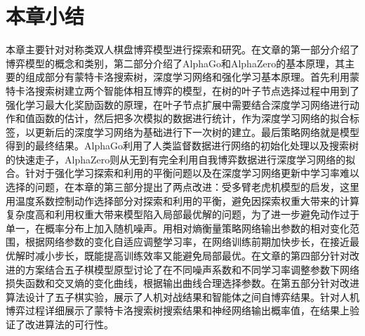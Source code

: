 \section{本章小结}

本章主要针对对称类双人棋盘博弈模型进行探索和研究。在文章的第一部分介绍了博弈模型的概念和类别，第二部分介绍了AlphaGo和AlphaZero的基本原理，其主要的组成部分有蒙特卡洛搜索树，深度学习网络和强化学习基本原理。首先利用蒙特卡洛搜索树建立两个智能体相互博弈的模型，在树的叶子节点选择过程中用到了强化学习最大化奖励函数的原理，在叶子节点扩展中需要结合深度学习网络进行动作和值函数的估计，然后把多次模拟的数据进行统计，作为深度学习网络的拟合标签，以更新后的深度学习网络为基础进行下一次树的建立。最后策略网络就是模型得到的最终结果。AlphaGo利用了人类监督数据进行网络的初始化处理以及搜索树的快速走子，AlphaZero则从无到有完全利用自我博弈数据进行深度学习网络的拟合。针对于强化学习探索和利用的平衡问题以及在深度学习网络更新中学习率难以选择的问题，在本章的第三部分提出了两点改进：受多臂老虎机模型的启发，这里用温度系数控制动作选择部分对探索和利用的平衡，避免因探索权重大带来的计算复杂度高和利用权重大带来模型陷入局部最优解的问题，为了进一步避免动作过于单一，在概率分布上加入随机噪声。用相对熵衡量策略网络输出参数的相对变化范围，根据网络参数的变化自适应调整学习率，在网络训练前期加快步长，在接近最优解时减小步长，既能提高训练效率又能避免局部最优。在文章的第四部分针对改进的方案结合五子棋模型原型讨论了在不同噪声系数和不同学习率调整参数下网络损失函数和交叉熵的变化曲线，根据输出曲线合理选择参数。在第五部分针对改进算法设计了五子棋实验，展示了人机对战结果和智能体之间自博弈结果。针对人机博弈过程详细展示了蒙特卡洛搜索树搜索结果和神经网络输出概率值，在结果上验证了改进算法的可行性。